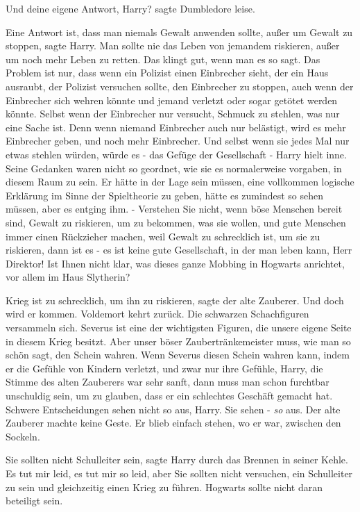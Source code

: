 \glqq{}Und deine eigene Antwort, Harry?\grqq{} sagte Dumbledore leise.

\glqq{}Eine Antwort ist, dass man niemals Gewalt anwenden sollte, außer um Gewalt
zu stoppen\grqq{}, sagte Harry. \glqq{}Man sollte nie das Leben von jemandem
riskieren, außer um noch mehr Leben zu retten. Das klingt gut, wenn man es so
sagt. Das Problem ist nur, dass wenn ein Polizist einen Einbrecher sieht, der
ein Haus ausraubt, der Polizist versuchen sollte, den Einbrecher zu stoppen,
auch wenn der Einbrecher sich wehren könnte und jemand verletzt oder sogar
getötet werden könnte. Selbst wenn der Einbrecher nur versucht, Schmuck zu
stehlen, was nur eine Sache ist. Denn wenn niemand Einbrecher auch nur
belästigt, wird es mehr Einbrecher geben, und noch mehr Einbrecher. Und selbst
wenn sie jedes Mal nur etwas stehlen würden, würde es - das Gefüge der
Gesellschaft -\grqq{} Harry hielt inne. Seine Gedanken waren nicht so geordnet,
wie sie es normalerweise vorgaben, in diesem Raum zu sein. Er hätte in der Lage
sein müssen, eine vollkommen logische Erklärung im Sinne der Spieltheorie zu
geben, hätte es zumindest so sehen müssen, aber es entging ihm. - \glqq{}
Verstehen Sie nicht, wenn böse Menschen bereit sind, Gewalt zu riskieren, um zu
bekommen, was sie wollen, und gute Menschen immer einen Rückzieher machen, weil
Gewalt zu schrecklich ist, um sie zu riskieren, dann ist es - es ist keine gute
Gesellschaft, in der man leben kann, Herr Direktor! Ist Ihnen nicht klar, was
dieses ganze Mobbing in Hogwarts anrichtet, vor allem im Haus Slytherin?\grqq{}

\glqq{}Krieg ist zu schrecklich, um ihn zu riskieren\grqq{}, sagte der alte
Zauberer. \glqq{}Und doch wird er kommen. Voldemort kehrt zurück. Die schwarzen
Schachfiguren versammeln sich. Severus ist eine der wichtigsten Figuren, die
unsere eigene Seite in diesem Krieg besitzt. Aber unser böser
Zaubertränkemeister muss, wie man so schön sagt, den Schein wahren. Wenn Severus
diesen Schein wahren kann, indem er die Gefühle von Kindern verletzt, und zwar
nur ihre Gefühle, Harry\grqq{}, die Stimme des alten Zauberers war sehr sanft,
\glqq{}dann muss man schon furchtbar unschuldig sein, um zu glauben, dass er ein
schlechtes Geschäft gemacht hat. Schwere Entscheidungen sehen nicht so aus,
Harry. Sie sehen - \emph{so} aus.\grqq{} Der alte Zauberer machte keine Geste.
Er blieb einfach stehen, wo er war, zwischen den Sockeln.

\glqq{}Sie sollten nicht Schulleiter sein\grqq{}, sagte Harry durch das Brennen
in seiner Kehle. \glqq{}Es tut mir leid, es tut mir so leid, aber Sie sollten
nicht versuchen, ein Schulleiter zu sein und gleichzeitig einen Krieg zu führen.
Hogwarts sollte nicht daran beteiligt sein.\grqq{}

